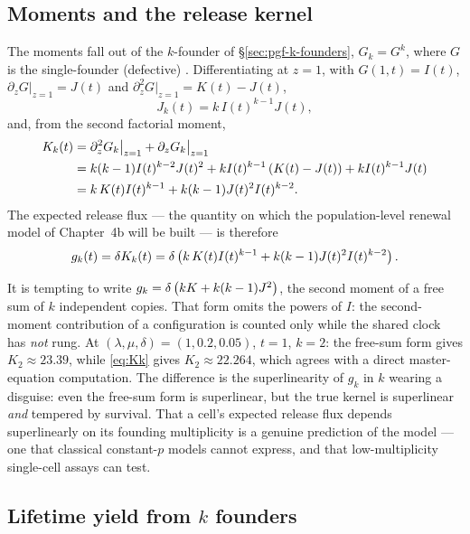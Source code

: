 \subsection{Moments and the release kernel}
\label{sec:moi-moments}

The moments fall out of the $k$-founder \pgf{} of
\S\ref{sec:pgf-k-founders}, $G_k=G^k$, where $G$ is the single-founder
(defective) \pgf. Differentiating at $z=1$, with $G(1,t)=I(t)$,
$\partial_zG|_{z=1}=J(t)$ and $\partial_z^2G|_{z=1}=K(t)-J(t)$,
\begin{equation}
J_k(t)=k\,I(t)^{k-1}J(t),
\label{eq:Jk}
\end{equation}
and, from the second factorial moment,
\begin{align}
K_k(t)&=\partial_z^2G_k\big|_{z=1}+\partial_zG_k\big|_{z=1}\nonumber\\
&=k(k-1)I(t)^{k-2}J(t)^2+kI(t)^{k-1}\left( K(t)-J(t)\right)+kI(t)^{k-1}J(t)\nonumber\\
&=k\,K(t)I(t)^{k-1}+k(k-1)J(t)^2I(t)^{k-2}.
\label{eq:Kk}
\end{align}
The expected release flux --- the quantity on which the population-level
renewal model of Chapter~4b will be built --- is therefore
\begin{equation}
g_k(t)=\delta K_k(t)
=\delta\left( k\,K(t)I(t)^{k-1}+k(k-1)J(t)^2I(t)^{k-2}\right).
\label{eq:gk}
\end{equation}

\begin{remark}
\label{rem:gk}
It is tempting to write $g_k=\delta\left( kK+k(k-1)J^2\right)$, the second moment of
a free sum of $k$ independent copies. That form omits the powers of $I$: the
second-moment contribution of a configuration is counted only while the
shared clock has \emph{not} rung. At $(\lambda,\mu,\delta)=(1,0.2,0.05)$,
$t=1$, $k=2$: the free-sum form gives $K_2\approx23.39$, while
\eqref{eq:Kk} gives $K_2\approx22.264$, which agrees with a direct
master-equation computation. The difference is the superlinearity of $g_k$
in $k$ wearing a disguise: even the free-sum form is superlinear, but the
true kernel is superlinear \emph{and} tempered by survival. That a cell's
expected release flux depends superlinearly on its founding multiplicity is
a genuine prediction of the model --- one that classical constant-$p$ models
cannot express, and that low-multiplicity single-cell assays can test.
\end{remark}

\subsection{Lifetime yield from $k$ founders}

